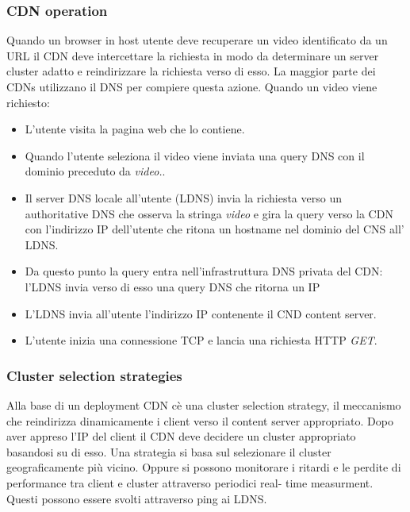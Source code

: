 \subsubsection{CDN operation}
Quando un browser in host utente deve recuperare un video identificato da un URL il CDN deve intercettare la richiesta in modo da determinare un server
cluster adatto e reindirizzare la richiesta verso di esso. La maggior parte dei CDNs utilizzano il DNS per compiere questa azione. Quando un video viene
richiesto:
\begin{itemize}
\item L'utente visita la pagina web che lo contiene.
\item Quando l'utente seleziona il video viene inviata una query DNS con il dominio preceduto da \emph{video.}.
\item Il server DNS locale all'utente (LDNS) invia la richiesta verso un authoritative DNS che osserva la stringa \emph{video} e gira la query verso la CDN 
con l'indirizzo IP dell'utente che ritona un hostname nel dominio del CNS all' LDNS.
\item Da questo punto la query entra nell'infrastruttura DNS privata del CDN: l'LDNS invia verso di esso una query DNS che ritorna un IP
\item L'LDNS invia all'utente l'indirizzo IP contenente il CND content server.
\item L'utente inizia una connessione TCP e lancia una richiesta HTTP \emph{GET}.
\end{itemize}
\subsubsection{Cluster selection strategies}
Alla base di un deployment CDN c\`e una cluster selection strategy, il meccanismo che reindirizza dinamicamente i client verso il content server 
appropriato. Dopo aver appreso l'IP del client il CDN deve decidere un cluster appropriato basandosi su di esso. Una strategia si basa sul selezionare
il cluster geograficamente pi\`u vicino. Oppure si possono monitorare i ritardi e le perdite di performance tra client e cluster attraverso periodici real-
time measurment. Questi possono essere svolti attraverso ping ai LDNS.